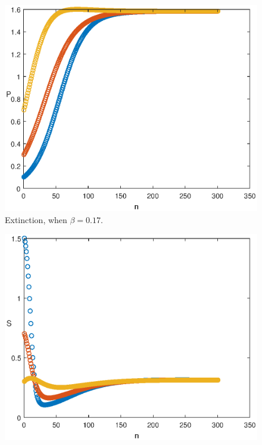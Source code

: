 \documentclass[reqno]{amsart}
\begin{document}
{{\begin{figure}
\begin{minipage}[b]{.32\linewidth}
  \end{minipage}
  \begin{minipage}[b]{.32\linewidth}
        \includegraphics[width=\linewidth]{Predator_EXT_AUT.eps}
  \end{minipage}
    \caption{Extinction, when $\beta=0.17$.}
      \label{fig-no-autonomous-DF-1}
\end{figure}
\begin{figure}
  \begin{minipage}[b]{.32\linewidth}
    \includegraphics[width=\linewidth]{Susceptible_PERS_AUT.eps}

\end{minipage}
\end{figure}}}
\end{document}
